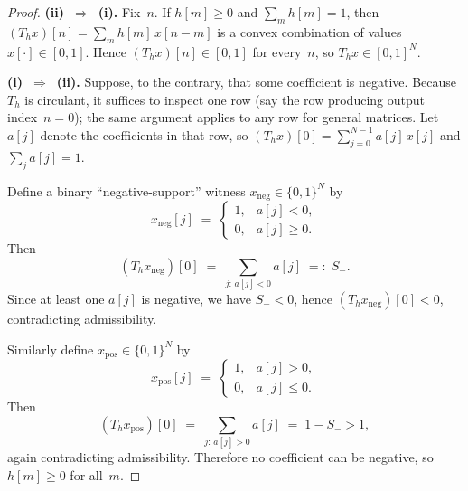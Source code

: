 \documentclass[10pt,a4paper]{amsart}
\newcommand{\Sminus}{S_{-}}
\newcommand{\xneg}{x_{\mathrm{neg}}}
\newcommand{\xpos}{x_{\mathrm{pos}}}
\begin{document}
\begin{proof}
\textbf{(ii)~$\Rightarrow$~(i).}\;
Fix~$n$.  If $h[m] \ge 0$ and $\sum_m h[m] = 1$, then
$(T_h x)[n] = \sum_m h[m]\,x[n-m]$ is a convex combination of values
$x[\cdot] \in [0,1]$.  Hence $(T_h x)[n] \in [0,1]$ for every~$n$, so
$T_h x \in [0,1]^N$.

\medskip\noindent
\textbf{(i)~$\Rightarrow$~(ii).}\;
Suppose, to the contrary, that some coefficient is negative.  Because~$T_h$ is
circulant, it suffices to inspect one row (say the row producing output
index~$n = 0$); the same argument applies to any row for general matrices.  Let
$a[j]$ denote the coefficients in that row, so
$(T_h x)[0] = \sum_{j=0}^{N-1} a[j]\,x[j]$ and $\sum_j a[j] = 1$.

Define a binary ``negative-support'' witness $\xneg \in \{0,1\}^N$ by
\[
  \xneg[j] \;=\;
  \begin{cases}
    1, & a[j] < 0,\\
    0, & a[j] \ge 0.
  \end{cases}
\]
Then
\[
  (T_h \xneg)[0]
  \;=\; \sum_{j:\,a[j]<0} a[j]
  \;=:\; \Sminus.
\]
Since at least one $a[j]$ is negative, we have $\Sminus < 0$, hence
$(T_h \xneg)[0] < 0$, contradicting admissibility.

Similarly define $\xpos \in \{0,1\}^N$ by
\[
  \xpos[j] \;=\;
  \begin{cases}
    1, & a[j] > 0,\\
    0, & a[j] \le 0.
  \end{cases}
\]
Then
\[
  (T_h \xpos)[0]
  \;=\; \sum_{j:\,a[j]>0} a[j]
  \;=\; 1 - \Sminus > 1,
\]
again contradicting admissibility.  Therefore no coefficient can be negative, so
$h[m] \ge 0$ for all~$m$.
\end{proof}
\end{document}
